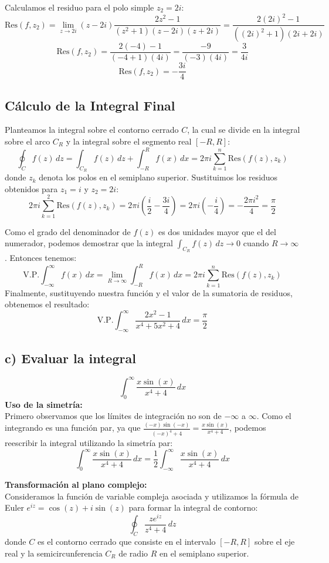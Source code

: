 \documentclass[a4paper, 12pt]{article}
\begin{document}
Calculamos el residuo para el polo simple $z_2 = 2i$:
\[
\text{Res}(f, z_2) = \lim_{z \to 2i} (z-2i) \frac{2z^2 - 1}{(z^2+1)(z-2i)(z+2i)} = \frac{2(2i)^2 - 1}{((2i)^2+1)(2i+2i)}
\]
\[
\text{Res}(f, z_2) = \frac{2(-4) - 1}{(-4+1)(4i)} = \frac{-9}{(-3)(4i)} = \frac{3}{4i} 
\]
\[
\boxed{\text{Res}(f, z_2)= -\frac{3i}{4}}
\]
\subsection*{Cálculo de la Integral Final}
Planteamos la integral sobre el contorno cerrado $C$, la cual se divide en la integral sobre el arco $C_R$ y la integral sobre el segmento real $[-R, R]$:
\[
\oint_C f(z) \, dz = \int_{C_R} f(z) \, dz + \int_{-R}^{R} f(x) \, dx = 2\pi i \sum_{k=1}^{n} \text{Res}(f(z), z_k)
\]
donde $z_k$ denota los polos en el semiplano superior. Sustituimos los residuos obtenidos para $z_1 = i$ y $z_2 = 2i$:
\[
2\pi i \sum_{k=1}^{2} \text{Res}(f(z), z_k) = 2\pi i \left( \frac{i}{2} - \frac{3i}{4} \right) = 2\pi i \left( -\frac{i}{4} \right) = - \frac{2\pi i^2}{4} = \frac{\pi}{2}
\]

Como el grado del denominador de $f(z)$ es dos unidades mayor que el del numerador, podemos demostrar que la integral $\int_{C_R} f(z) \, dz \to 0$ cuando $R \to \infty$. Entonces tenemos:
\[
\text{V.P.} \int_{-\infty}^{\infty} f(x) \, dx = \lim_{R \to \infty} \int_{-R}^{R} f(x) \, dx = 2\pi i \sum_{k=1}^{n} \text{Res}(f(z), z_k)
\]
Finalmente, sustituyendo nuestra función y el valor de la sumatoria de residuos, obtenemos el resultado:
\[\boxed{
\text{V.P.} \int_{-\infty}^{\infty} \frac{2x^2 - 1}{x^4 + 5x^2 + 4} \, dx = \frac{\pi}{2}}
\]

\subsection{c) Evaluar la integral }
\[\int_{0}^{\infty} \frac{x \sin(x)}{x^4 + 4} \, dx\]
\textbf{Uso de la simetría:} \\
Primero observamos que los límites de integración no son de $-\infty$ a $\infty$. Como el integrando es una función par, ya que $\frac{(-x)\sin(-x)}{(-x)^4+4} = \frac{x\sin(x)}{x^4+4}$, podemos reescribir la integral utilizando la simetría par:
\[
\int_{0}^{\infty} \frac{x \sin(x)}{x^4 + 4} \, dx = \frac{1}{2} \int_{-\infty}^{\infty} \frac{x \sin(x)}{x^4 + 4} \, dx
\]

\textbf{Transformación al plano complejo:} \\
Consideramos la función de variable compleja asociada y utilizamos la fórmula de Euler $e^{iz} = \cos(z) + i\sin(z)$ para formar la integral de contorno:
\[
\oint_C \frac{z e^{iz}}{z^4 + 4} \, dz
\]
donde $C$ es el contorno cerrado que consiste en el intervalo $[-R, R]$ sobre el eje real y la semicircunferencia $C_R$ de radio $R$ en el semiplano superior.
\end{document}
